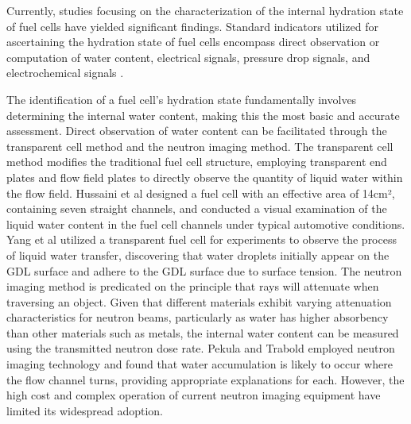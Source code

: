 Currently, studies focusing on the characterization of the internal hydration state of fuel cells have yielded significant findings. Standard indicators utilized for ascertaining the hydration state of fuel cells encompass direct observation or computation of water content, electrical signals, pressure drop signals, and electrochemical signals \cite{hussainiVisualizationQuantificationCathode2009}.
\par
The identification of a fuel cell's hydration state fundamentally involves determining the internal water content, making this the most basic and accurate assessment. Direct observation of water content can be facilitated through the transparent cell method and the neutron imaging method. The transparent cell method modifies the traditional fuel cell structure, employing transparent end plates and flow field plates to directly observe the quantity of liquid water within the flow field\cite{leeVisualizationFloodingSingle2012}. Hussaini et al\cite{hussainiVisualizationQuantificationCathode2009} designed a fuel cell with an effective area of 14cm², containing seven straight channels, and conducted a visual examination of the liquid water content in the fuel cell channels under typical automotive conditions. Yang et al\cite{yangVisualizationLiquidWater2004} utilized a transparent fuel cell for experiments to observe the process of liquid water transfer, discovering that water droplets initially appear on the GDL surface and adhere to the GDL surface due to surface tension. The neutron imaging method is predicated on the principle that rays will attenuate when traversing an object. Given that different materials exhibit varying attenuation characteristics for neutron beams, particularly as water has higher absorbency than other materials such as metals, the internal water content can be measured using the transmitted neutron dose rate. Pekula\cite{pekulaStudyWaterDistribution2005} and Trabold\cite{traboldSituInvestigationWater2006} employed neutron imaging technology and found that water accumulation is likely to occur where the flow channel turns, providing appropriate explanations for each. However, the high cost and complex operation of current neutron imaging equipment have limited its widespread adoption.
